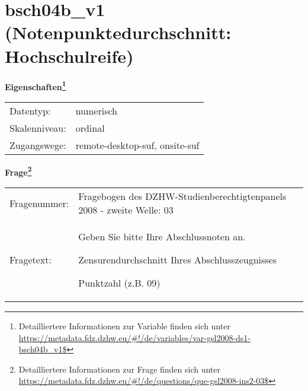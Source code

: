 
    \setcounter{footnote}{0}

    \vspace*{-1.8cm}
	\section{bsch04b\_v1 (Notenpunktedurchschnitt: Hochschulreife)}
	\label{section:bsch04b_v1}



    \vspace*{0.5cm}
    \noindent\textbf{Eigenschaften\footnote{Detailliertere Informationen zur Variable finden sich unter
		\url{https://metadata.fdz.dzhw.eu/\#!/de/variables/var-gsl2008-ds1-bsch04b_v1$}}}\\
	\begin{tabularx}{\hsize}{@{}lX}
	Datentyp: & numerisch \\
	Skalenniveau: & ordinal \\
	Zugangswege: &
	  remote-desktop-suf, 
	  onsite-suf
 \\
    \end{tabularx}



				\vspace*{0.5cm}
                \noindent\textbf{Frage\footnote{Detailliertere Informationen zur Frage finden sich unter
		              \url{https://metadata.fdz.dzhw.eu/\#!/de/questions/que-gsl2008-ins2-03$}}}\\
				\begin{tabularx}{\hsize}{@{}lX}
					Fragenummer: &
					  Fragebogen des DZHW-Studienberechtigtenpanels 2008 - zweite Welle:
					  03
 \\
					Fragetext: & Geben Sie bitte Ihre Abschlussnoten an.\par  Zensurendurchschnitt Ihres Abschlusszeugnisses\par  Punktzahl (z.B. 09) \\
				\end{tabularx}





